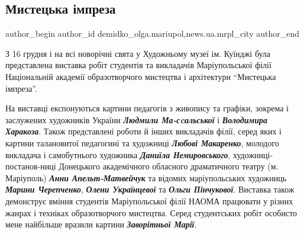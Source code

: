  
 
 
 
 
 
\subsection{Мистецька імпреза}
\label{sec:06_01_2022.stz.news.ua.mrpl_city.1.mystecka_impreza}
 
\ifcmt
 author_begin
   author_id demidko_olga.mariupol,news.ua.mrpl_city
 author_end
\fi


З 16 грудня і на всі новорічні свята у Художньому музеї ім. Куїнджі була
представлена виставка робіт студентів та викладачів Маріупольської філії
Національній академії образотворчого мистецтва і архітектури \enquote{Мистецька
імпреза}.


На виставці експонуються картини педагогів з живопису та графіки, зокрема і
заслужених художників України \emph{\textbf{Людмили Ма\hyp{}сcальської}} і \emph{\textbf{Володимира Харакоза}}. Також
представлені роботи й інших викладачів філії, серед яких і картини талановитої
педагогині та художниці \emph{\textbf{Любові Макаренко}}, молодого викладача і самобутнього
художника \emph{\textbf{Даниїла Немировського}}, художниці-постанов\hyp{}ниці Донецького академічного
обласного драматичного театру (м. Маріуполь) \emph{\textbf{Анни Апельт-Матвейчук}} та відомих
маріупольських художниць \emph{\textbf{Марини Черепченко}}, \emph{\textbf{Олени Українцевої}} та \textbf{\emph{Ольги
Пінчукової}}. Виставка також демонструє вміння студентів Маріупольської філії
НАОМА працювати у різних жанрах і техніках образотворчого мистецтва. Серед
студентських робіт особисто мене найбільше вразили картини \emph{\textbf{Заворітньої Марії}}.


